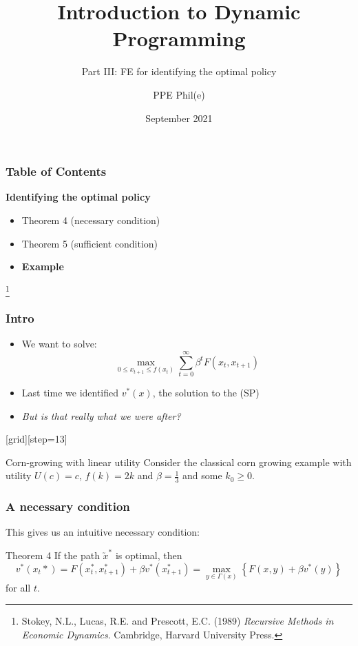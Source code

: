 \documentclass[aspectratio=169]{beamer}
\title[Dynamic Programming Part III] %
{Introduction to Dynamic Programming}
\subtitle{Part III: FE for identifying the optimal policy}
\author[PPE Phil(e)]
{PPE Phil(e)\inst{1}}
\institute[] %
{
  \inst{1}%
  material @ https://github.com/PPEphile
}
\date[2021] %
{September 2021}
\newcommand\blfootnote[1]{%
\begingroup
\renewcommand\thefootnote{}\footnote{#1}%
\addtocounter{footnote}{-1}%
\endgroup
}
\begin{document}
\frame{\titlepage}

\begin{frame}
\frametitle{Table of Contents}
\textbf{Identifying the \color{teal} optimal policy} \color{black} 
\begin{itemize}
\item Theorem 4 (necessary condition)
\item Theorem 5 (sufficient condition)
\item \textbf{Example}
\end{itemize}

\blfootnote{Stokey, N.L., Lucas, R.E. and Prescott, E.C. (1989) \textit{Recursive Methods in Economic Dynamics}. Cambridge, Harvard University Press.}

\end{frame}
%
\begin{frame}
\frametitle{Intro}
\begin{itemize}
\item We want to solve: 
\begin{equation}
\max_{0 \leq x_{t+1} \leq f(x_t)} \sum^{\infty}_{t=0} \beta^t F(x_t, x_{t+1}) \tag{SP}
\end{equation}
\item Last time we identified $v^*(x)$, the solution to the (SP)
\item \color{red}\textit{But is that really what we were after?} \color{black}
\end{itemize}

\end{frame}

{
[grid][step=13]
\begin{frame}[t]
\begin{block}{Corn-growing with linear utility}
Consider the classical corn growing example with utility $U(c)=c$, $f(k)=2 k$ and $\beta= \frac{1}{3}$ and some $k_0 \geq 0$.
\end{block}
\end{frame}

}



\begin{frame}
\frametitle{A necessary condition}
This gives us an intuitive necessary condition:
\begin{block}{Theorem 4}
If the path $\utilde{x}^{*}$ is optimal, then
\begin{equation*}
v^{*}(x_{t}{*}) = F(x_{t}^{*}, x_{t+1}^{*}) + \beta v^{*}(x_{t+1}^{*}) = \max_{y \in \Gamma(x)} \left\lbrace F(x, y) + \beta v^{*}(y) \right\rbrace
\end{equation*}
for all $t$.
\end{block}
\end{frame}
\end{document}
